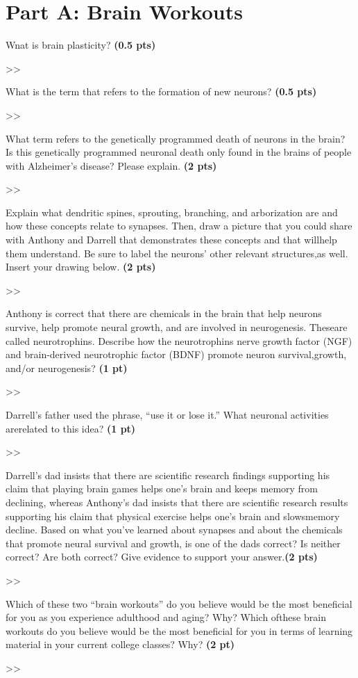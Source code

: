 \documentclass[12pt,a4paper]{article}
\begin{document}
\section*{Part A: Brain Workouts}
\begin{enumerate}[font=\bfseries, wide]
    {\color{under}\item Wnat is brain plasticity? \textbf{(0.5 pts)}}

    >>
    {\color{under}\item What is the term that refers to the formation of new neurons? \textbf{(0.5 pts)}}

    >> 
    {\color{under}\item What term refers to the genetically programmed death of neurons in the brain? Is this genetically programmed neuronal death only found in the brains of people with Alzheimer’s disease? Please explain. \textbf{(2 pts)}}

    >> 
    {\color{under}\item Explain what dendritic spines, sprouting, branching, and arborization are and how these concepts relate to synapses. Then, draw a picture that you could share with Anthony and Darrell that demonstrates these concepts and that willhelp them understand. Be sure to label the neurons’ other relevant structures,as well.  Insert your drawing below.  \textbf{(2 pts)}}

    >> 
    {\color{under}\item Anthony is correct that there are chemicals in the brain that help neurons survive, help promote neural growth, and are involved in neurogenesis. Theseare called neurotrophins. Describe how the neurotrophins nerve growth factor (NGF) and brain-derived neurotrophic factor (BDNF) promote neuron survival,growth, and/or neurogenesis? \textbf{(1 pt)}}

    >> 
    {\color{under}\item Darrell’s father used the phrase, “use it or lose it.” What neuronal activities arerelated to this idea? \textbf{(1 pt)}}

    >> 
    {\color{under}\item Darrell’s dad insists that there are scientific research findings supporting his claim that playing brain games helps one’s brain and keeps memory from declining, whereas Anthony’s dad insists that there are scientific research results supporting his claim that physical exercise helps one’s brain and slowsmemory decline. Based on what you’ve learned about synapses and about the chemicals that promote neural survival and growth, is one of the dads correct? Is neither correct? Are both correct? Give evidence to support your answer.\textbf{(2 pts)}}

    >> 
    {\color{under}\item Which of these two “brain workouts” do you believe would be the most beneficial for you as you experience adulthood and aging? Why? Which ofthese brain workouts do you believe would be the most beneficial for you in terms of learning material in your current college classes? Why? \textbf{(2 pt)}}

    >> 
\end{enumerate}
\end{document}
